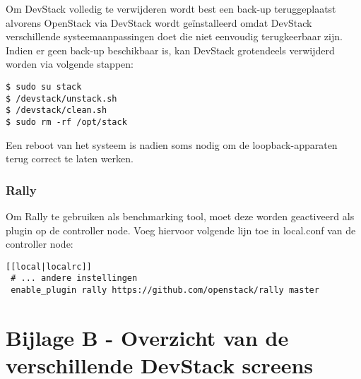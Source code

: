 \begin{appendices}
Om DevStack volledig te verwijderen wordt best een back-up teruggeplaatst alvorens OpenStack via DevStack wordt geïnstalleerd omdat DevStack verschillende systeemaanpassingen doet die niet eenvoudig terugkeerbaar zijn. Indien er geen back-up beschikbaar is, kan DevStack grotendeels verwijderd worden via volgende stappen:

\begin{code}
\begin{verbatim}
$ sudo su stack
$ /devstack/unstack.sh
$ /devstack/clean.sh
$ sudo rm -rf /opt/stack
\end{verbatim}
\end{code}

Een reboot van het systeem is nadien soms nodig om de loopback-apparaten terug correct te laten werken.

\subsubsection{Rally}
 
Om Rally te gebruiken als benchmarking tool, moet deze worden geactiveerd als plugin op de controller node. Voeg hiervoor volgende lijn toe in local.conf van de controller node:
 
\begin{code}
\begin{verbatim}
[[local|localrc]]
 # ... andere instellingen
 enable_plugin rally https://github.com/openstack/rally master
\end{verbatim}
\end{code}

\section*{Bijlage B - Overzicht van de verschillende DevStack screens}
\label{att:openstack_services}
 

\end{appendices}

